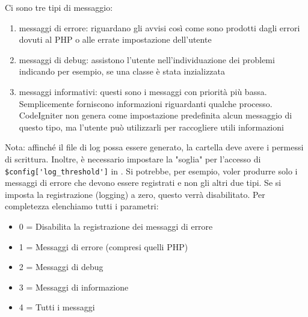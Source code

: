 \begin{itemize}
Ci sono tre tipi di messaggio:
\begin{enumerate}
\item messaggi di errore: riguardano gli avvisi così come sono prodotti dagli errori dovuti al \ac{PHP} o alle errate impostazione dell'utente
\item messaggi di debug: assistono l'utente nell'individuazione dei problemi indicando per esempio, se una classe è stata inzializzata
\item messaggi informativi: questi sono i messaggi con priorità più bassa. Semplicemente forniscono informazioni riguardanti qualche processo. CodeIgniter non genera come impostazione predefinita alcun messaggio di questo tipo, ma l'utente può utilizzarli per raccogliere utili informazioni
\end{enumerate}

Nota: affinché il file di log possa essere generato, la cartella  deve avere i permessi di scrittura. Inoltre, è necessario impostare la "soglia" per l'accesso di \verb|$config['log_threshold']| in . Si potrebbe, per esempio, voler produrre solo i messaggi di errore che devono essere registrati e non gli altri due tipi. Se si imposta la registrazione (logging) a zero, questo verrà disabilitato. Per completezza elenchiamo tutti i parametri:

\begin{itemize}
\item 0 = Disabilita la registrazione dei messaggi di errore
\item 1 = Messaggi di errore (compresi quelli PHP)
\item 2 = Messaggi di debug
\item 3 = Messaggi di informazione
\item 4 = Tutti i messaggi
\end{itemize}
\end{itemize}